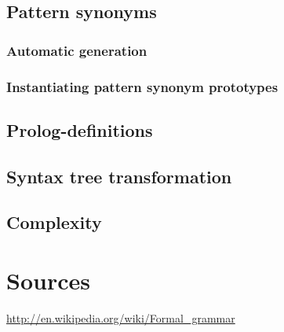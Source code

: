 \documentclass[a4paper]{article}
\begin{document}
\subsection*{Pattern synonyms}
\subsubsection*{Automatic generation}

\subsubsection*{Instantiating pattern synonym prototypes}


\subsection*{Prolog-definitions}


\subsection*{Syntax tree transformation}


\subsection*{Complexity}


\section*{Sources}
\url{http://en.wikipedia.org/wiki/Formal_grammar}
\end{document}
